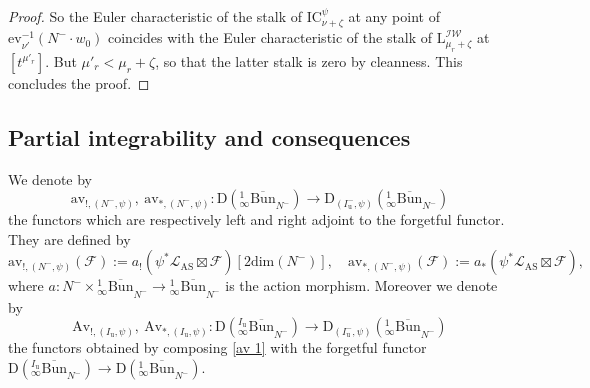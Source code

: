 \documentclass[11pt]{amsart}
\theoremstyle{plain}
\theoremstyle{remark}
\numberwithin{equation}{section}
\begin{document}
\begin{proof}
So the Euler characteristic of the stalk of $\mathrm{IC}_{\nu+\zeta}^\psi$ at any point of $\mathrm{ev}_{\nu'}^{-1}(N^-\cdot w_0)$ coincides with the Euler characteristic of the stalk of $\mathrm{L}_{\mu_r+\zeta}^\mathcal{IW}$ at $[t^{\mu'_r}]$. But $\mu'_r<\mu_r+\zeta$, so that the latter stalk is zero by cleanness. This concludes the proof.
	\end{proof}
	\subsection{Partial integrability and consequences}
	We denote by
	\begin{equation}\label{av 1}
		\mathrm{av}_{!,(N^-,\psi)},~\mathrm{av}_{*,(N^-,\psi)}:\mathrm{D}({_{ \infty}^1\overline{\mathrm{Bun}}}_{N^-})\to \mathrm{D}_{(I^-_\mathrm{u},\psi)}({_{ \infty}^1\overline{\mathrm{Bun}}}_{N^-}) 
	\end{equation}
	the functors which are respectively left and right adjoint to the forgetful functor. They are defined by
 $$\mathrm{av}_{!,(N^-,\psi)}(\mathcal{F}):=a_!(\psi^*\mathcal{L}_{\mathrm{AS}}\boxtimes\mathcal{F})[2\mathrm{dim}(N^-)],\quad  \mathrm{av}_{*,(N^-,\psi)}(\mathcal{F}):=a_*(\psi^*\mathcal{L}_{\mathrm{AS}}\boxtimes\mathcal{F}),$$
 where $a:N^-\times {_{ \infty}^1\overline{\mathrm{Bun}}}_{N^-}\to {_{ \infty}^1\overline{\mathrm{Bun}}}_{N^-}$ is the action morphism.
 Moreover we denote by
	$$\mathrm{Av}_{!,(I_\mathrm{u},\psi)},~\mathrm{Av}_{*,(I_\mathrm{u},\psi)}:\mathrm{D}({_{ \infty}^{I_\mathrm{u}}\overline{\mathrm{Bun}}}_{N^-})\to \mathrm{D}_{(I^-_\mathrm{u},\psi)}({_{ \infty}^1\overline{\mathrm{Bun}}}_{N^-}) $$
	the functors obtained by composing \eqref{av 1} with the forgetful functor $\mathrm{D}({_{ \infty}^{I_\mathrm{u}}\overline{\mathrm{Bun}}}_{N^-})\to \mathrm{D}({_{ \infty}^1\overline{\mathrm{Bun}}}_{N^-}) $. 
\end{document}

